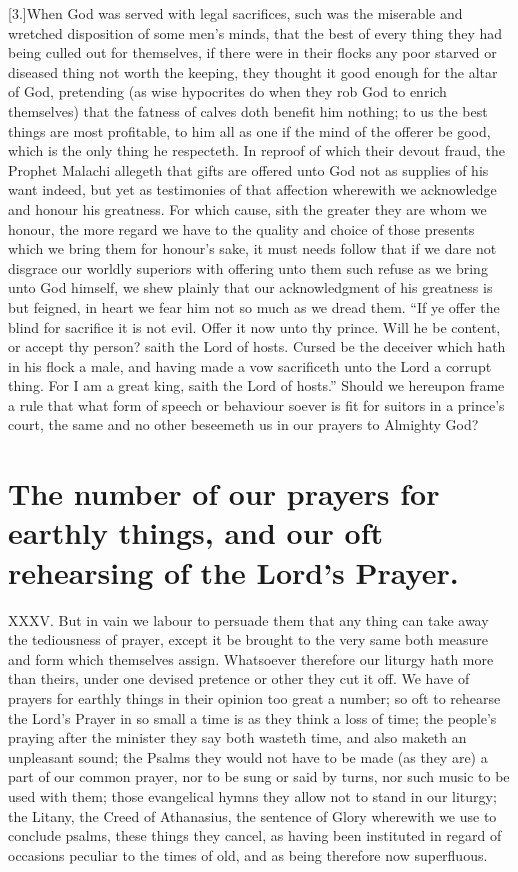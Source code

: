 [3.]When God was served with legal sacrifices, such was the miserable and wretched disposition of some men’s minds, that the best of every thing they had being culled out for themselves, if there were in their flocks any poor starved or diseased thing not worth the keeping, they thought it good enough for the altar of God, pretending (as wise hypocrites do when they rob God to enrich themselves) that the fatness of calves doth benefit him nothing; to us the best things are most profitable, to him all as one if the mind of the offerer be good, which is the only thing he respecteth. In reproof of which their devout fraud, the Prophet Malachi allegeth that gifts are offered unto God not as supplies of his want indeed, but yet as testimonies of that affection wherewith we acknowledge and honour his greatness. For which cause, sith the greater they are whom we honour, the more regard we have to the quality and choice of those presents which we bring them for honour’s sake, it must needs follow that if we dare not disgrace our worldly superiors with offering unto them such refuse as we bring unto God himself, we shew plainly that our acknowledgment of his greatness is but feigned, in heart we fear him not so much as we dread them. “If ye offer the blind for sacrifice it is not evil. Offer it now unto  thy prince.
 Will he be content, or accept thy person? saith the Lord of hosts. Cursed be the deceiver which hath in his flock a male, and having made a vow sacrificeth unto the Lord a corrupt thing. For I am a great king, saith the Lord of hosts.” Should we hereupon frame a rule that what form of speech or behaviour soever is fit for suitors in a prince’s court, the same and no other beseemeth us in our prayers to Almighty God?


\section*{The number of our prayers for earthly things, and our oft rehearsing of the Lord’s Prayer.}
XXXV. But in vain we labour to persuade them that any thing can take away the tediousness of prayer, except it be brought to the very same both measure and form which themselves assign. Whatsoever therefore our liturgy hath more than theirs, under one devised pretence or other they cut it off. We have of prayers for earthly things in their opinion too great a number; so oft to rehearse the Lord’s Prayer in so small a time is as they think a loss of time; the people’s praying after the minister they say both wasteth time, and also maketh an unpleasant sound; the Psalms they would not have to be made (as they are) a part of our common prayer, nor to be sung or said by turns, nor such music to be used with them; those evangelical hymns they allow not to stand in our liturgy; the Litany, the Creed of Athanasius, the sentence of Glory wherewith we use to conclude psalms, these things they cancel, as having been instituted  in regard of occasions peculiar to the times of old, and as being therefore now superfluous.

